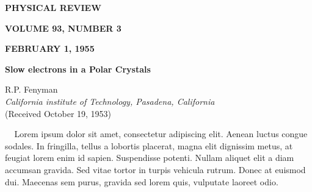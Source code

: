 \documentclass[a4paper, 9pt]{article}
\begin{document}
 
\begin{minipage}[t]{0.3\textwidth}
	\begin{flushleft}
		\scriptsize\textbf{PHYSICAL REVIEW}
	\end{flushleft}	
\end{minipage}
\begin{minipage}[t]{0.3\textwidth}
\begin{center}
\scriptsize\textbf{VOLUME 93, NUMBER 3}	
\end{center}
\end{minipage}
\begin{minipage}[t]{0.3\textwidth}
	\begin{flushright}
		\scriptsize\textbf{FEBRUARY 1, 1955}
	\end{flushright}
\end{minipage}
\newline\begin{center}\large\textbf{Slow electrons in a Polar Crystals}\\\end{center}\begin{center}\scriptsize R.P. Fenyman\\\textit{California institute of Technology, Pasadena, California}\\(Received October 19, 1953)\end{center}
\begin{minipage}[t]{0.1\textwidth}
	\begin{center}
	\end{center}
\end{minipage}
\begin{minipage}[t]{0.8\textwidth}
	\begin{flushleft}
		\footnotesize $\;\;\;\;$Lorem ipsum dolor sit amet, consectetur adipiscing elit. Aenean luctus congue sodales. In fringilla, tellus a lobortis placerat, magna elit dignissim metus, at feugiat lorem enim id sapien. Suspendisse potenti. Nullam aliquet elit a diam accumsan gravida. Sed vitae tortor in turpis vehicula rutrum. Donec at euismod dui. Maecenas sem purus, gravida sed lorem quis, vulputate laoreet odio.
	\end{flushleft}
\end{minipage}
\begin{minipage}[t]{0.1\textwidth}
	\begin{center}
	\end{center}
\end{minipage}
\end{document}
